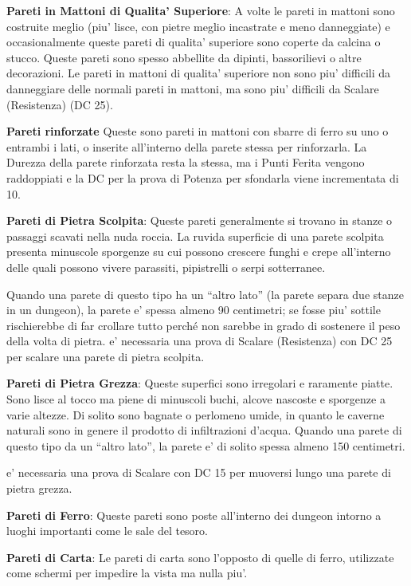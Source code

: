 \documentclass[a4paper,11pt,twoside,openany]{dndbook}
\begin{document}
\textbf{Pareti in Mattoni di Qualita' Superiore}: A volte le pareti in mattoni sono costruite meglio (piu' lisce, con pietre meglio incastrate e meno danneggiate) e occasionalmente queste pareti di qualita' superiore sono coperte da calcina o stucco. Queste pareti sono spesso abbellite da dipinti, bassorilievi o altre decorazioni. Le pareti in mattoni di qualita' superiore non sono piu' difficili da danneggiare delle normali pareti in mattoni, ma sono piu' difficili da Scalare (Resistenza) (DC 25).

\textbf{Pareti rinforzate} Queste sono pareti in mattoni con sbarre di ferro su uno o entrambi i lati, o inserite all’interno della parete stessa per rinforzarla. La Durezza della parete rinforzata resta la stessa, ma i Punti Ferita vengono raddoppiati e la DC per la prova di Potenza per sfondarla viene incrementata di 10.

\textbf{Pareti di Pietra Scolpita}: Queste pareti generalmente si trovano in stanze o passaggi scavati nella nuda roccia. La ruvida superficie di una parete scolpita presenta minuscole sporgenze su cui possono crescere funghi e crepe all'interno delle quali possono vivere parassiti, pipistrelli o serpi sotterranee. 

Quando una parete di questo tipo ha un ``altro lato'' (la parete separa due stanze in un dungeon), la parete e' spessa almeno 90 centimetri; se fosse piu' sottile rischierebbe di far crollare tutto perché non sarebbe in grado di sostenere il peso della volta di pietra. e' necessaria una prova di Scalare (Resistenza) con DC 25 per scalare una parete di pietra scolpita.

\textbf{Pareti di Pietra Grezza}: Queste superfici sono irregolari e raramente piatte. Sono lisce al tocco ma piene di minuscoli buchi, alcove nascoste e sporgenze a varie altezze. Di solito sono bagnate o perlomeno umide, in quanto le caverne naturali sono in genere il prodotto di infiltrazioni d'acqua. Quando una parete di questo tipo da un ``altro lato'', la parete e' di solito spessa almeno 150 centimetri.

e' necessaria una prova di Scalare con DC 15 per muoversi lungo una parete di pietra grezza.

\textbf{Pareti di Ferro}: Queste pareti sono poste all'interno dei dungeon intorno a luoghi importanti come le sale del tesoro.

\textbf{Pareti di Carta}: Le pareti di carta sono l'opposto di quelle di ferro, utilizzate come schermi per impedire la vista ma nulla piu'.
\end{document}

